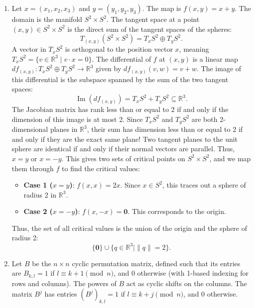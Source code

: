 \documentclass{article}
\begin{document}
\begin{enumerate}[label=\fbox{\arabic*}]
  \item %
        Let $x = (x_1, x_2, x_3)$ and $y = (y_1, y_2, y_3)$. The map is $f(x, y) = x + y$.
        The domain is the manifold $S^2 \times S^2$. The tangent space at a point $(x, y) \in S^2 \times S^2$ is the direct sum of the tangent spaces of the spheres:
        \[
          T_{(x, y)} (S^2 \times S^2) = T_x S^2 \oplus T_y S^2.
        \]
        A vector in $T_x S^2$ is orthogonal to the position vector $x$, meaning $T_x S^2 = \{ v \in \mathbb{R}^3 \mid v \cdot x = 0 \}$.
        The differential of $f$ at $(x, y)$ is a linear map $df_{(x, y)} : T_x S^2 \oplus T_y S^2 \to \mathbb{R}^3$ given by $df_{(x, y)}(v, w) = v + w$.
        The image of this differential is the subspace spanned by the sum of the two tangent spaces:
        \[
          \operatorname{Im}(df_{(x, y)}) = T_x S^2 + T_y S^2 \subseteq \mathbb{R}^3.
        \]
        The Jacobian matrix has rank less than or equal to 2 if and only if the dimension of this image is at most 2.
        Since $T_x S^2$ and $T_y S^2$ are both 2-dimensional planes in $\mathbb{R}^3$, their sum has dimension less than or equal to 2 if and only if they are the exact same plane!
        Two tangent planes to the unit sphere are identical if and only if their normal vectors are parallel. Thus, $x = y$ or $x = -y$.
        This gives two sets of critical points on $S^2 \times S^2$, and we map them through $f$ to find the critical values:
        \begin{itemize}
          \item \textbf{Case 1 ($x = y$)}: $f(x, x) = 2x$. Since $x \in S^2$, this traces out a sphere of radius 2 in $\mathbb{R}^3$.
          \item \textbf{Case 2 ($x = -y$)}: $f(x, -x) = \bm{0}$. This corresponds to the origin.
        \end{itemize}
        Thus, the set of all critical values is the union of the origin and the sphere of radius 2:
        \[
          \{ \bm{0} \} \cup \{ q \in \mathbb{R}^3 \mid \|q\| = 2 \}.
        \]

  \item %
        Let $B$ be the $n \times n$ cyclic permutation matrix, defined such that its entries are $B_{k, l} = 1$ if $l \equiv k+1 \pmod n$, and $0$ otherwise (with 1-based indexing for rows and columns).
        The powers of $B$ act as cyclic shifts on the columns. The matrix $B^j$ has entries $(B^j)_{k, l} = 1$ if $l \equiv k+j \pmod n$, and $0$ otherwise.
        

\end{enumerate}
\end{document}
